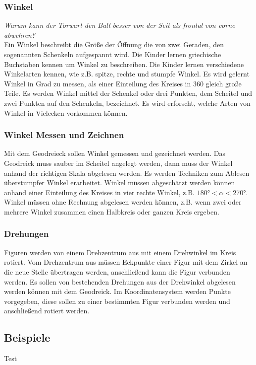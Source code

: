 \documentclass{article}
\begin{document}
\subsubsection*{Winkel}
\textit{Warum kann der Torwart den Ball besser von der Seit als frontal von vorne abwehren?}\\
Ein Winkel beschreibt die Größe der Öffnung die von zwei Geraden, den sogenannten Schenkeln aufgespannt wird. Die Kinder lernen griechische Buchstaben kennen um Winkel zu beschreiben.
Die Kinder lernen verschiedene Winkelarten kennen, wie  z.B. spitze, rechte und stumpfe Winkel. Es wird gelernt Winkel in Grad zu messen, als einer Einteilung des Kreises in 360 gleich große Teile.
Es werden Winkel mittel der Schenkel oder drei Punkten, dem Scheitel und zwei Punkten auf den Schenkeln, bezeichnet.
Es wird erforscht, welche Arten von Winkel in Vielecken vorkommen können.
\subsubsection*{Winkel Messen und Zeichnen}
Mit dem Geodreieck sollen Winkel gemessen und gezeichnet werden. Das Geodreick muss sauber im Scheitel angelegt werden, dann muss der Winkel anhand der richtigen Skala abgelesen werden.
Es werden Techniken zum Ablesen überstumpfer Winkel erarbeitet. Winkel müssen abgeschätzt werden können anhand einer Einteilung des Kreises in vier rechte Winkel, z.B. $180° < \alpha < 270°$.
Winkel müssen ohne Rechnung abgelesen werden können, z.B. wenn zwei oder mehrere Winkel zusammen einen Halbkreis oder ganzen Kreis ergeben.
\subsubsection*{Drehungen}
Figuren werden von einem Drehzentrum aus mit einem Drehwinkel im Kreis rotiert. Vom Drehzentrum aus müssen Eckpunkte einer Figur mit dem Zirkel an die neue Stelle übertragen werden, anschließend kann die Figur verbunden werden.
Es sollen von bestehenden Drehungen aus der Drehwinkel abgelesen werden können mit dem Geodreick. Im Koordinatensystem werden Punkte vorgegeben, diese sollen zu einer bestimmten Figur verbunden werden und anschließend rotiert werden.
\subsection{Beispiele}
\begin{tcolorbox}[colback=gray!5!white,colframe=gray!25!black]
Test
\end{tcolorbox}
\end{document}
